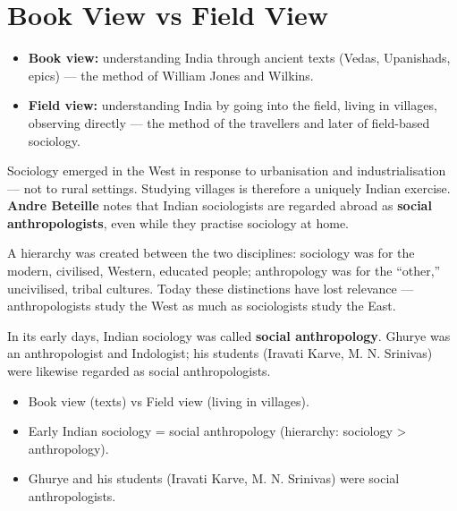 \section{Book View vs Field View}

\begin{ComparisonBox}
\begin{itemize}
\item \textbf{Book view:} understanding India through ancient texts (Vedas, Upanishads, epics) --- the method of William Jones and Wilkins.
\item \textbf{Field view:} understanding India by going into the field, living in villages, observing directly --- the method of the travellers and later of field-based sociology.
\end{itemize}
\end{ComparisonBox}

Sociology emerged in the West in response to urbanisation and industrialisation --- not to rural settings. Studying villages is therefore a uniquely Indian exercise. \textbf{Andre Beteille} notes that Indian sociologists are regarded abroad as \textbf{social anthropologists}, even while they practise sociology at home.

\begin{CriticalPoint}
A hierarchy was created between the two disciplines: sociology was for the modern, civilised, Western, educated people; anthropology was for the ``other,'' uncivilised, tribal cultures. Today these distinctions have lost relevance --- anthropologists study the West as much as sociologists study the East.
\end{CriticalPoint}

In its early days, Indian sociology was called \textbf{social anthropology}. Ghurye was an anthropologist and Indologist; his students (Iravati Karve, M. N. Srinivas) were likewise regarded as social anthropologists.

\begin{QuickRevision}
\begin{itemize}
\item Book view (texts) vs Field view (living in villages).
\item Early Indian sociology = social anthropology (hierarchy: sociology > anthropology).
\item Ghurye and his students (Iravati Karve, M. N. Srinivas) were social anthropologists.
\end{itemize}
\end{QuickRevision}

